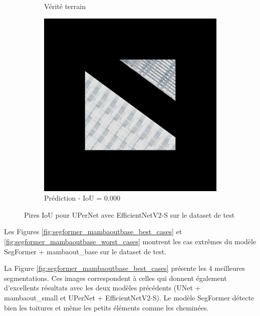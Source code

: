 \begin{figure}[H]
\begin{subfigure}{0.32\textwidth}
    \caption{Vérité terrain}
\end{subfigure}
\hfill
\begin{subfigure}{0.32\textwidth}
    \includegraphics[width=\textwidth]{02-main//figures/ch4/kfold_ensembles/upernet_tu-efficientnetv2_rw_s.ra2_in1k/worst_cases/worst_1_iou0.000_24931113_tile_19_19_52ccbb_overlay_pred.png}
    \caption{Prédiction - IoU = 0.000}
\end{subfigure}

\caption{Pires IoU pour UPerNet avec EfficientNetV2-S sur le dataset de test}
\label{fig:upernet_efficientnetv2_s_worst_cases}
\end{figure}


Les Figures \ref{fig:segformer_mambaoutbase_best_cases} et \ref{fig:segformer_mambaoutbase_worst_cases} montrent les cas extrêmes du modèle SegFormer + mambaout\_base sur le dataset de test.

La Figure \ref{fig:segformer_mambaoutbase_best_cases} présente les 4 meilleures segmentations. Ces images correspondent à celles qui donnent également d'excellents résultats avec les deux modèles précédents (UNet + mambaout\_small et UPerNet + EfficientNetV2-S). Le modèle SegFormer détecte bien les toitures et même les petits éléments comme les cheminées.


